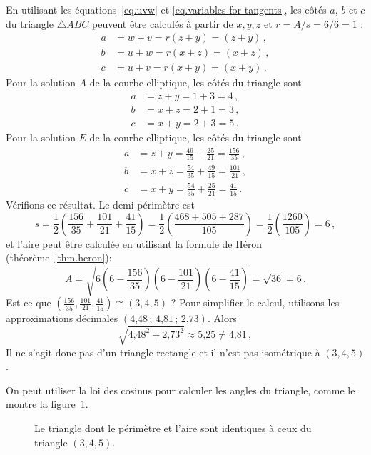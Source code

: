 En utilisant les équations~\ref{eq.uvw} et  \ref{eq.variables-for-tangents},  les côtés $a$, $b$ et $c$ du triangle $\triangle ABC$ peuvent être calculés à partir de $x,y,z$ et $r=A/s=6/6=1$ :
%
\begin{align*}
a&=w+v = r(z+y)=(z+y)\,,\\
b&=u+w= r(x+z)=(x+z)\,,\\
c&=u+v=r(x+y)=(x+y)\,.
\end{align*}
Pour la solution $A$ de la courbe elliptique, les côtés du triangle sont 
\begin{align*}
a &= z+y = 1+3 = 4\,,\\
b &= x+z = 2+1=3\,,\\
c &= x+y = 2+3=5\,.
\end{align*}
Pour la solution $E$ de la courbe elliptique, les côtés du triangle sont 
\begin{align*}
a &= z+y = \frac{49}{15} + \frac{25}{21} = \frac{156}{35}\,,\\
b &= x+z = \frac{54}{35} + \frac{49}{15} = \frac{101}{21}\,,\\
c &= x+y = \frac{54}{35} + \frac{25}{21} =\frac{41}{15}\,.
\end{align*}
Vérifions ce résultat. Le demi-périmètre est 
\[
s=\frac{1}{2}\left(\frac{156}{35} + \frac{101}{21}+\frac{41}{15}\right) = \frac{1}{2}\left(\frac{468+505+287}{105}\right) = \frac{1}{2}\left(\frac{1260}{105}\right)= 6\,,
\]
et l'aire peut être calculée en utilisant la formule de Héron (théorème~\ref{thm.heron}):
\[
A= \sqrt{6 \left(6-\frac{156}{35}\right) \left(6-\frac{101}{21}\right) \left(6-\frac{41}{15}\right)}=\sqrt{36} = 6\,.
\]
Est-ce que $\left(\frac{156}{35}, \frac{101}{21}, \frac{41}{15}\right)\cong(3,4,5)$ ? Pour simplifier le calcul, utilisons les approximations décimales $(\mbox{4,48}\,;\, \mbox{4,81}\,;\, \mbox{2,73})$. Alors 
\[
\sqrt{\mbox{4,48}^2+\mbox{2,73}^2}\approx \mbox{5,25}\neq \mbox{4,81}\,,
\]
Il ne s'agit donc pas d'un triangle rectangle et il n'est pas isométrique à $(3,4,5)$.

On peut utiliser la loi des cosinus  pour calculer les angles du triangle, comme le montre la figure~\ref{f.not-a-right-triangle}.


\begin{figure}[htbp]
\centering

\caption{Le triangle dont le périmètre et l'aire sont identiques à ceux du triangle  $(3,4,5)$.}\label{f.not-a-right-triangle}
\end{figure}




